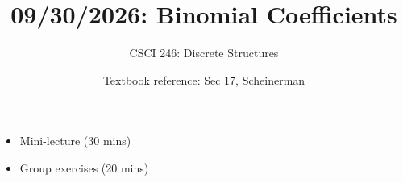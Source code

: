 \documentclass[10pt]{beamer}
\begin{document}






\title{09/30/2026: Binomial Coefficients}
\author{CSCI 246: Discrete Structures}
\date{Textbook reference: Sec 17, Scheinerman}

\begin{frame}
    \titlepage 
\end{frame}


\begin{frame}



\begin{myyellowbox}[title=Today's Agenda]
\begin{itemize}
	\item Mini-lecture (30 mins)
	\item Group exercises (20 mins)
\end{itemize}

%	
\end{myyellowbox}
\vfill 

\end{frame}
\end{document}
